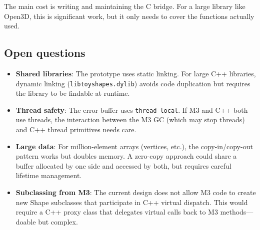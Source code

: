 \documentclass[11pt]{article}
\begin{document}
The main cost is writing and maintaining the C bridge.  For a large
library like Open3D, this is significant work, but it only needs to
cover the functions actually used.

\subsection{Open questions}

\begin{itemize}
\item \textbf{Shared libraries}: The prototype uses static linking.
  For large C++ libraries, dynamic linking
  (\texttt{libtoyshapes.dylib}) avoids code duplication but requires
  the library to be findable at runtime.

\item \textbf{Thread safety}: The error buffer uses
  \texttt{thread\_local}.  If M3 and C++ both use threads, the
  interaction between the M3 GC (which may stop threads) and C++
  thread primitives needs care.

\item \textbf{Large data}: For million-element arrays (vertices,
  etc.), the copy-in/copy-out pattern works but doubles memory.
  A zero-copy approach could share a buffer allocated by one side
  and accessed by both, but requires careful lifetime management.

\item \textbf{Subclassing from M3}: The current design does not
  allow M3 code to create new Shape subclasses that participate in
  C++ virtual dispatch.  This would require a C++ proxy class
  that delegates virtual calls back to M3 methods---doable but
  complex.
\end{itemize}
\end{document}
